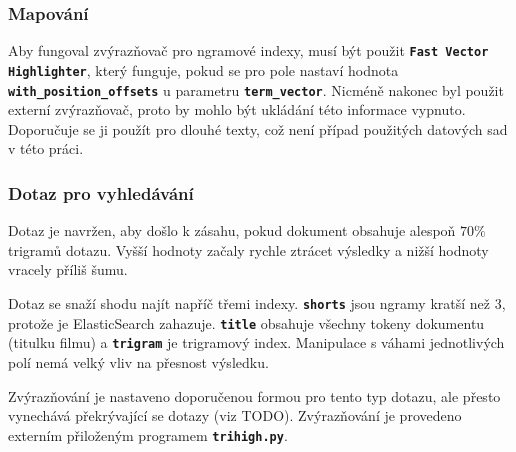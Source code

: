 \documentclass[11pt,letterpaper,oneside,openright]{book}
\newcommand{\bftt}[1]{\texttt{\textbf{#1}}}
\begin{document}


\subsubsection{Mapování}
Aby fungoval zvýrazňovač pro ngramové indexy, musí být použit \bftt{Fast
Vector Highlighter}, který funguje, pokud se pro pole nastaví hodnota
\bftt{with\_position\_offsets} u parametru \bftt{term\_vector}. Nicméně
nakonec byl použit externí zvýrazňovač, proto by mohlo být ukládání této
informace vypnuto. Doporučuje se ji použít pro dlouhé texty, což není
případ použitých datových sad v této práci.



\subsubsection{Dotaz pro vyhledávání}
Dotaz je navržen, aby došlo k zásahu, pokud dokument obsahuje alespoň
$70\%$ trigramů dotazu. Vyšší hodnoty začaly rychle ztrácet výsledky a
nižší hodnoty vracely příliš šumu.

Dotaz se snaží shodu najít napříč třemi indexy. \bftt{shorts} jsou
ngramy kratší než $3$, protože je ElasticSearch zahazuje. \bftt{title}
obsahuje všechny tokeny dokumentu (titulku filmu) a \bftt{trigram} je
trigramový index. Manipulace s váhami jednotlivých polí nemá velký vliv
na přesnost výsledku.

Zvýrazňování je nastaveno doporučenou formou pro tento typ dotazu, ale
přesto vynechává překrývající se dotazy (viz TODO). Zvýrazňování je
provedeno externím přiloženým programem \bftt{trihigh.py}.




\backmatter
\end{document}
